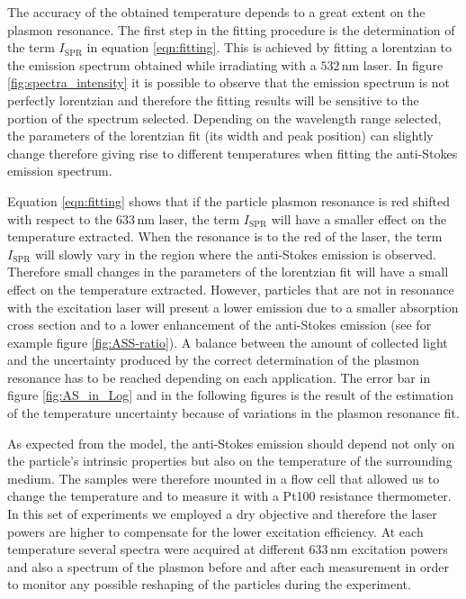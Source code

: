 \documentclass[journal=nalefd,manuscript=letter]{achemso}
\newcommand{\nm}{\ensuremath{\,\textrm{nm}}}
\begin{document}
The accuracy of the obtained temperature depends to a great extent on the
plasmon resonance. The first step in the fitting procedure is the determination
of the term $I_\textrm{SPR}$ in equation \ref{eqn:fitting}. This is achieved by
fitting a lorentzian to the emission spectrum obtained while irradiating with a
$532\nm$ laser. In figure \ref{fig:spectra_intensity} it is possible to observe
that the emission spectrum is not perfectly lorentzian and therefore the fitting
results will be sensitive to the portion of the spectrum selected. Depending on
the wavelength range selected, the parameters of the lorentzian fit (its width
and peak position) can slightly change therefore giving rise to different
temperatures when fitting the anti-Stokes emission spectrum.

Equation \ref{eqn:fitting} shows that if the particle plasmon resonance is red
shifted with respect to the $633\nm$ laser, the term $I_\textrm{SPR}$ will have
a smaller effect on the temperature extracted. When the resonance is to the red
of the laser, the term $I_\textrm{SPR}$ will slowly vary in the region where the
anti-Stokes emission is observed. Therefore small changes in the parameters of
the lorentzian fit will have a small effect on the temperature extracted.
However, particles that are not in resonance with the excitation laser will
present a lower emission due to a smaller absorption cross section and to a
lower enhancement of the anti-Stokes emission (see for example figure
\ref{fig:ASS-ratio}). A balance between the amount of collected light and the
uncertainty produced by the correct determination of the plasmon resonance has
to be reached depending on each application. The error bar in figure
\ref{fig:AS_in_Log} and in the following figures is the result of the estimation
of the temperature uncertainty because of variations in the plasmon resonance
fit.

As expected from the model, the anti-Stokes emission should depend not only on
the particle's intrinsic properties but also on the temperature of the
surrounding medium\cite{Konrad2013}. The samples were therefore mounted in a
flow cell that allowed us to change the temperature and to measure it with a
Pt100 resistance thermometer. In this set of experiments we employed a dry
objective and therefore the laser powers are higher to compensate for the lower
excitation efficiency. At each temperature several spectra were acquired at
different $633\nm$ excitation powers and also a spectrum of the plasmon before
and after each measurement in order to monitor any possible reshaping of the
particles during the experiment.
\end{document}
